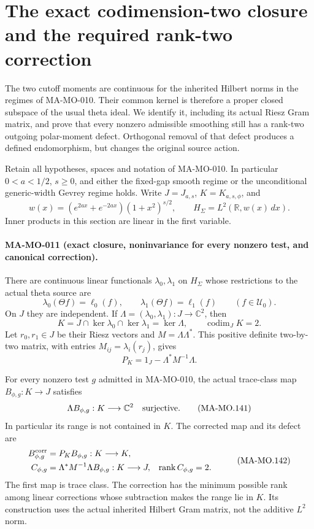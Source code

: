\section{The exact codimension-two closure and the required rank-two correction}
\label{sec:pole-free-closure}

The two cutoff moments are continuous for the inherited Hilbert
norms in the regimes of MA-MO-010. Their common kernel is therefore
a proper closed subspace of the usual theta ideal. We identify it,
including its actual Riesz Gram matrix, and prove that every nonzero
admissible smoothing still has a rank-two outgoing polar-moment
defect. Orthogonal removal of that defect produces a defined
endomorphism, but changes the original source action.

Retain all hypotheses, spaces and notation of MA-MO-010. In
particular \(0<a<1/2\), \(s\ge0\), and either the fixed-gap
smooth regime or the unconditional generic-width Gevrey regime
holds. Write \(J=J_{a,s}\), \(K=K_{a,s,\phi}\), and
\[
 w(x)=(e^{2ax}+e^{-2ax})(1+x^2)^{s/2},\qquad
 H_\Sigma=L^2(\mathbb R,w(x)\,dx).
 \tag{MA-MO.137}
\]
Inner products in this section are linear in the first variable.

\paragraph{MA-MO-011 (exact closure, noninvariance for every nonzero test,
and canonical correction).}
There are continuous linear functionals \(\lambda_0,\lambda_1\)
on \(H_\Sigma\) whose restrictions to the actual theta source are
\[
 \lambda_0(\Theta f)=\ell_0(f),\qquad
 \lambda_1(\Theta f)=\ell_1(f)
                         \qquad(f\in\mathscr U_0).
 \tag{MA-MO.138}
\]
On \(J\) they are independent. If
\(\Lambda=(\lambda_0,\lambda_1):J\to\mathbb C^2\), then
\[
                  K=J\cap\ker\lambda_0\cap\ker\lambda_1
                    =\ker\Lambda,
                    \qquad \operatorname{codim}_J K=2.
 \tag{MA-MO.139}
\]
Let \(r_0,r_1\in J\) be their Riesz vectors and
\(M=\Lambda\Lambda^*\). This positive definite two-by-two
matrix, with entries \(M_{ij}=\lambda_i(r_j)\), gives
\[
        P_K=1_J-\Lambda^*M^{-1}\Lambda.
 \tag{MA-MO.140}
\]

For every nonzero test \(g\) admitted in MA-MO-010, the actual
trace-class map \(B_{\phi,g}:K\to J\) satisfies
\[
             \Lambda B_{\phi,g}:K\longrightarrow\mathbb C^2
                       \quad\hbox{surjective}.
 \tag{MA-MO.141}
\]
In particular its range is not contained in \(K\). The corrected
map and its defect are
\[
 \begin{aligned}
 B_{\phi,g}^{\rm corr}&=P_KB_{\phi,g}:K\longrightarrow K,\\
 C_{\phi,g}&=\Lambda^*M^{-1}\Lambda B_{\phi,g}:K\longrightarrow J,
              &\operatorname{rank}C_{\phi,g}&=2.
 \end{aligned}
 \tag{MA-MO.142}
\]
The first map is trace class. The correction has the minimum
possible rank among linear corrections whose subtraction makes
the range lie in \(K\). Its construction uses the actual inherited
Hilbert Gram matrix, not the additive \(L^2\) norm.

